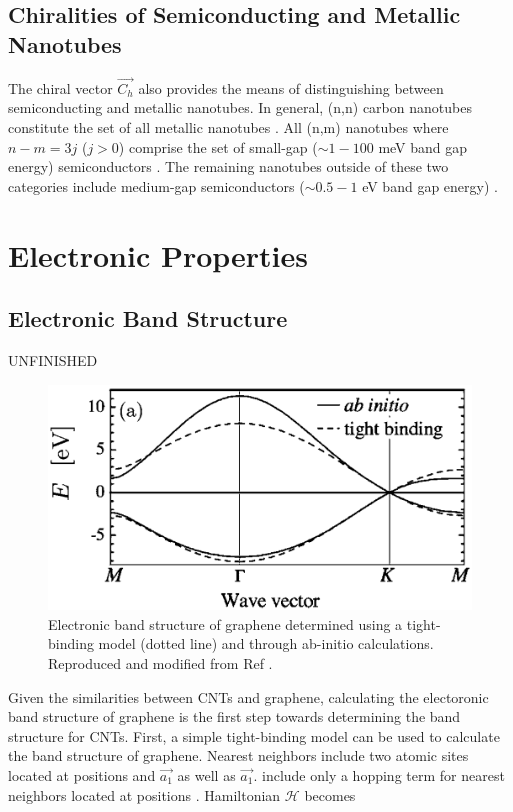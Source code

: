 \subsection{Chiralities of Semiconducting and Metallic Nanotubes}
The chiral vector $\vec{C_h}$ also provides the means of distinguishing between semiconducting and metallic nanotubes. In general, (n,n) carbon nanotubes constitute the set of all metallic nanotubes \cite{nanot2012optoelectronic}. All (n,m) nanotubes where $n-m = 3j$ ($j > 0$) comprise the set of small-gap ($\sim1 - 100$ meV band gap energy) semiconductors \cite{nanot2012optoelectronic}. The remaining nanotubes outside of these two categories include medium-gap semiconductors ($\sim0.5 - 1$ eV band gap energy) \cite{nanot2012optoelectronic}.


\section{Electronic Properties}

\subsection{Electronic Band Structure}

{\color{red} UNFINISHED}

\begin{figure}[h]
	\centering
	\includegraphics[scale=0.5]{images/chapter_optical_props/graphene_band_charlier}
	\caption{Electronic band structure of graphene determined using a tight-binding model (dotted line) and through ab-initio calculations. Reproduced and modified from Ref \cite{charlier2007electronic}.}
	\label{fig:graphene_band}
\end{figure}

Given the similarities between CNTs and graphene, calculating the electoronic band structure of graphene is the first step towards determining the band structure for CNTs. First, a simple tight-binding model can be used to calculate the band structure of graphene. Nearest neighbors include two atomic sites located at positions and $\vec{a_1}$ as well as $\vec{a_1}$. include only a hopping term for nearest neighbors located at positions . Hamiltonian $\mathcal{H}$ becomes



